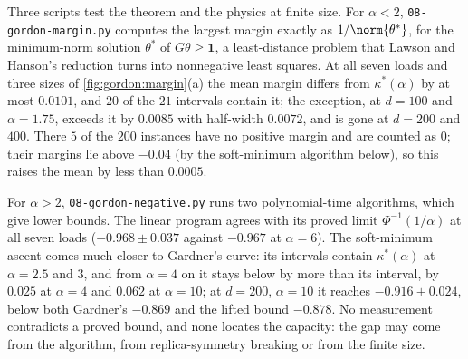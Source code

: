 \begin{refsection}
Three scripts test the theorem and the physics at finite size. For $\alpha<2$, \texttt{08-gordon-\allowbreak margin.py} computes the largest margin exactly as $1/\norm{\theta^*}$, for the minimum-norm solution $\theta^*$ of $G\theta\ge\mathbf 1$, a least-distance problem that Lawson and Hanson's reduction turns into nonnegative least squares. At all seven loads and three sizes of \cref{fig:gordon:margin}(a) the mean margin differs from $\kappa^*(\alpha)$ by at most $0.0101$, and $20$ of the $21$ intervals contain it; the exception, at $d=100$ and $\alpha=1.75$, exceeds it by $0.0085$ with half-width $0.0072$, and is gone at $d=200$ and $400$. There $5$ of the $200$ instances have no positive margin and are counted as $0$; their margins lie above $-0.04$ (by the soft-minimum algorithm below), so this raises the mean by less than $0.0005$.

For $\alpha>2$, \texttt{08-gordon-\allowbreak negative.py} runs two polynomial-time algorithms, which give lower bounds. The linear program agrees with its proved limit $\Phi^{-1}(1/\alpha)$ at all seven loads ($-0.968\pm0.037$ against $-0.967$ at $\alpha=6$). The soft-minimum ascent comes much closer to Gardner's curve: its intervals contain $\kappa^*(\alpha)$ at $\alpha=2.5$ and $3$, and from $\alpha=4$ on it stays below by more than its interval, by $0.025$ at $\alpha=4$ and $0.062$ at $\alpha=10$; at $d=200$, $\alpha=10$ it reaches $-0.916\pm0.024$, below both Gardner's $-0.869$ and the lifted bound $-0.878$. No measurement contradicts a proved bound, and none locates the capacity: the gap may come from the algorithm, from replica-symmetry breaking or from the finite size.


\end{refsection}
